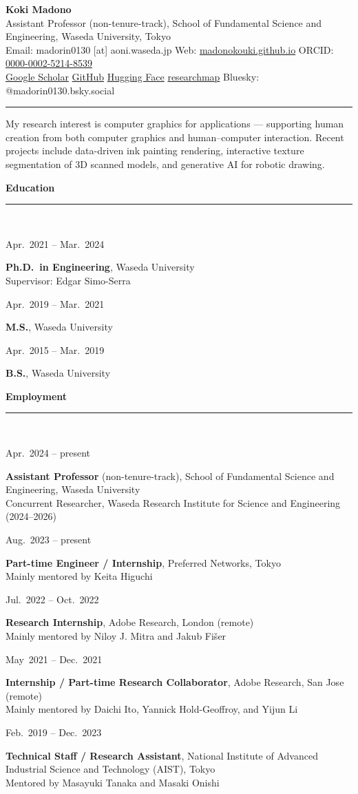 \documentclass[10pt,a4paper]{article}
\newcommand{\jp}[1]{{\jpfont #1}}
\newcommand{\cvsection}[1]{%
  \vspace{9pt}%
  {\large\bfseries\color{accent}#1}\\[-9pt]
  {\color{lightblue}\rule{\textwidth}{0.9pt}}\\[2pt]%
}
\newcommand{\cvline}[2]{%
  \noindent\begin{minipage}[t]{3.15cm}\strut\small\color{mutedc}#1\end{minipage}%
  \hspace{0.3cm}%
  \begin{minipage}[t]{\dimexpr\textwidth-3.45cm\relax}\strut #2\end{minipage}\par\vspace{3.5pt}%
}
\begin{document}
{\Huge\bfseries Koki Madono}\hspace{10pt}{\Large\color{mutedc}\jp{真殿 航輝}}\\[4pt]
{\color{mutedc}Assistant Professor (non-tenure-track), School of Fundamental Science and Engineering, Waseda University, Tokyo}\\[2pt]
{\small
Email: madorin0130 [at] aoni.waseda.jp \;\textbar\;
Web: \href{https://madonokouki.github.io}{madonokouki.github.io} \;\textbar\;
ORCID: \href{https://orcid.org/0000-0002-5214-8539}{0000-0002-5214-8539}\\
\href{https://scholar.google.com/citations?user=nVgMK4kAAAAJ}{Google Scholar} \;\textbar\;
\href{https://github.com/MADONOKOUKI}{GitHub} \;\textbar\;
\href{https://huggingface.co/madorin0130}{Hugging Face} \;\textbar\;
\href{https://researchmap.jp/madorin0130}{researchmap} \;\textbar\;
Bluesky: @madorin0130.bsky.social}\\[2pt]
{\color{lightblue}\rule{\textwidth}{1.6pt}}

\vspace{4pt}
{\small My research interest is computer graphics for applications --- supporting human creation from both computer
graphics and human--computer interaction. Recent projects include data-driven ink painting rendering, interactive
texture segmentation of 3D scanned models, and generative AI for robotic drawing.}

\cvsection{Education}
\cvline{Apr.~2021 -- Mar.~2024}{\textbf{Ph.D.\ in Engineering}, Waseda University \\{\small\color{mutedc}Supervisor: Edgar Simo-Serra}}
\cvline{Apr.~2019 -- Mar.~2021}{\textbf{M.S.}, Waseda University }
\cvline{Apr.~2015 -- Mar.~2019}{\textbf{B.S.}, Waseda University \quad {\small\color{mutedc}Supervisor: Tetsuji Ogawa}}

\cvsection{Employment}
\cvline{Apr.~2024 -- present}{\textbf{Assistant Professor} (non-tenure-track), School of Fundamental Science and Engineering, Waseda University \\{\small\color{mutedc}Concurrent Researcher, Waseda Research Institute for Science and Engineering (2024--2026)}}
\cvline{Aug.~2023 -- present}{\textbf{Part-time Engineer / Internship}, Preferred Networks, Tokyo \\{\small\color{mutedc}Mainly mentored by Keita Higuchi}}
\cvline{Jul.~2022 -- Oct.~2022}{\textbf{Research Internship}, Adobe Research, London (remote) \\{\small\color{mutedc}Mainly mentored by Niloy J. Mitra and Jakub Fišer}}
\cvline{May~2021 -- Dec.~2021}{\textbf{Internship / Part-time Research Collaborator}, Adobe Research, San Jose (remote) \\{\small\color{mutedc}Mainly mentored by Daichi Ito, Yannick Hold-Geoffroy, and Yijun Li}}
\cvline{Feb.~2019 -- Dec.~2023}{\textbf{Technical Staff / Research Assistant}, National Institute of Advanced Industrial Science and Technology (AIST), Tokyo \\{\small\color{mutedc}Mentored by Masayuki Tanaka and Masaki Onishi}}
\end{document}

